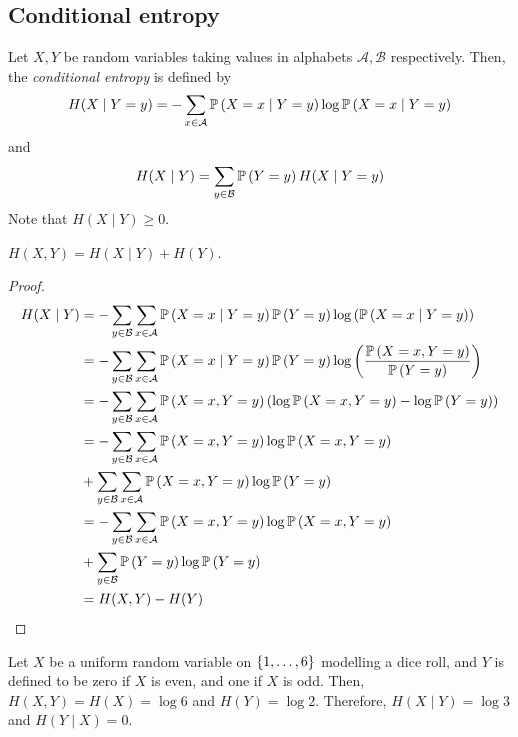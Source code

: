 \subsection{Conditional entropy}
\begin{definition}
    Let \( X, Y \) be random variables taking values in alphabets \( \mathcal A, \mathcal B \) respectively.
    Then, the \emph{conditional entropy} is defined by
    \[ H(X \mid Y = y) = - \sum_{x \in \mathcal A} \mathbb{P}\left({X = x \mid Y = y}\right) \log \mathbb{P}\left({X = x \mid Y = y}\right) \]
    and
    \[ H(X \mid Y) = \sum_{y \in \mathcal B} \mathbb{P}\left({Y = y}\right) H(X \mid Y = y) \]
    Note that \( H(X \mid Y) \geq 0 \).
\end{definition}
\begin{lemma}
    \( H(X,Y) = H(X \mid Y) + H(Y) \).
\end{lemma}
\begin{proof}
    \begin{align*}
        H(X \mid Y) &= -\sum_{y \in \mathcal B} \sum_{x \in \mathcal A} \mathbb{P}\left({X = x \mid Y = y}\right) \mathbb{P}\left({Y = y}\right) \log \qty(\mathbb{P}\left({X = x \mid Y = y}\right)) \\
        &= -\sum_{y \in \mathcal B} \sum_{x \in \mathcal A} \mathbb{P}\left({X = x \mid Y = y}\right) \mathbb{P}\left({Y = y}\right) \log \qty(\frac{\mathbb{P}\left({X = x, Y = y}\right)}{\mathbb{P}\left({Y = y}\right)}) \\
        &= -\sum_{y \in \mathcal B} \sum_{x \in \mathcal A} \mathbb{P}\left({X = x, Y = y}\right) \qty(\log \mathbb{P}\left({X = x, Y = y}\right) - \log \mathbb{P}\left({Y = y}\right)) \\
        &= -\sum_{y \in \mathcal B} \sum_{x \in \mathcal A} \mathbb{P}\left({X = x, Y = y}\right) \log \mathbb{P}\left({X = x, Y = y}\right) \\
        &+ \sum_{y \in \mathcal B} \sum_{x \in \mathcal A} \mathbb{P}\left({X = x, Y = y}\right) \log \mathbb{P}\left({Y = y}\right) \\
        &= -\sum_{y \in \mathcal B} \sum_{x \in \mathcal A} \mathbb{P}\left({X = x, Y = y}\right) \log \mathbb{P}\left({X = x, Y = y}\right) \\
        &+ \sum_{y \in \mathcal B} \mathbb{P}\left({Y = y}\right) \log \mathbb{P}\left({Y = y}\right) \\
        &= H(X,Y) - H(Y)
    \end{align*}
\end{proof}
\begin{example}
    Let \( X \) be a uniform random variable on \( \qty{1, \dots, 6} \) modelling a dice roll, and \( Y \) is defined to be zero if \( X \) is even, and one if \( X \) is odd.
    Then, \( H(X,Y) = H(X) = \log 6 \) and \( H(Y) = \log 2 \).
    Therefore, \( H(X \mid Y) = \log 3 \) and \( H(Y \mid X) = 0 \).
\end{example}
